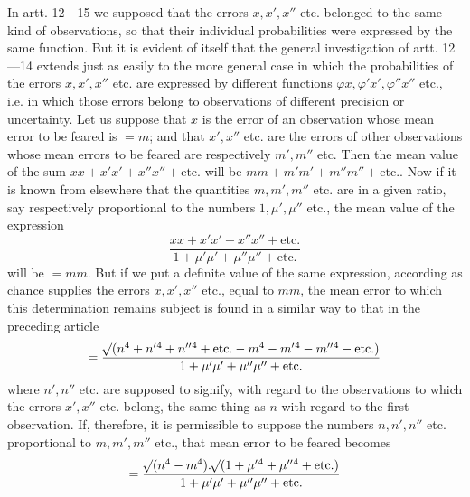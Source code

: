 In artt. 12---15 we supposed that the errors \(x,x',x''\) etc. belonged to the same kind of observations, so that their individual probabilities were expressed by the same function. But it is evident of itself that the general investigation of artt. 12---14 extends just as easily to the more general case in which the probabilities of the errors \(x,x',x''\) etc. are expressed by different functions \(\varphi x,\varphi'x',\varphi''x''\) etc., i.e. in which those errors belong to observations of different precision or uncertainty. Let us suppose that \(x\) is the error of an observation whose mean error to be feared is \(=m\); and that \(x',x''\) etc. are the errors of other observations whose mean errors to be feared are respectively \(m',m''\) etc. Then the mean value of the sum \(xx+x'x'+x''x''+\text{etc.}\) will be \(mm+m'm'+m''m''+\text{etc.}\). Now if it is known from elsewhere that the quantities \(m,m',m''\) etc. are in a given ratio, say respectively proportional to the numbers \(1,\mu',\mu''\) etc., the mean value of the expression
\[
\frac{xx+x'x'+x''x''+\text{etc.}}{1+\mu'\mu'+\mu''\mu''+\text{etc.}}
\]
will be \(=mm\). But if we put a definite value of the same expression, according as chance supplies the errors \(x,x',x''\) etc., equal to \(mm\), the mean error to which this determination remains subject is found in a similar way to that in the preceding article
\[
=\frac{\mathord{{}^{}\!\surd}(n^4+n'{}^4+n''{}^4+\text{etc.}-m^4-m'{}^4-m''{}^4-\text{etc.})}{1+\mu'\mu'+\mu''\mu''+\text{etc.}}
\]
where \(n',n''\) etc. are supposed to signify, with regard to the observations to which the errors \(x',x''\) etc. belong, the same thing as \(n\) with regard to the first observation. If, therefore, it is permissible to suppose the numbers \(n,n',n''\) etc. proportional to \(m,m',m''\) etc., that mean error to be feared becomes
\[
=\frac{\mathord{{}^{}\!\surd}(n^4-m^4).\mathord{{}^{}\!\surd}(1+\mu'{}^4+\mu''{}^4+\text{etc.})}{1+\mu'\mu'+\mu''\mu''+\text{etc.}}
\]

